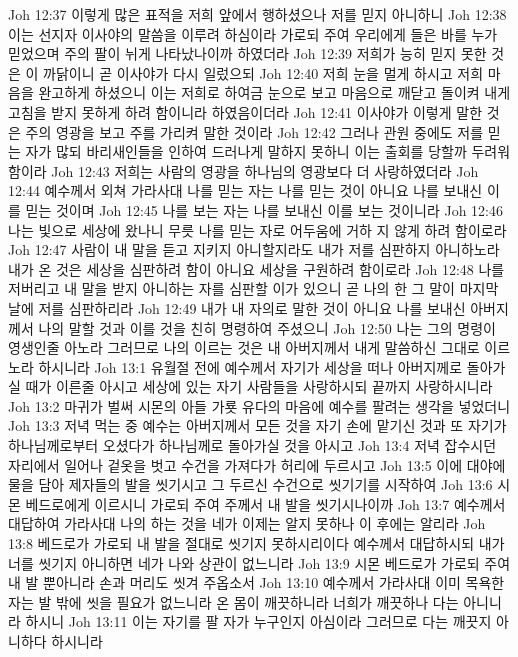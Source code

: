 Joh 12:37  이렇게 많은 표적을 저희 앞에서 행하셨으나 저를 믿지 아니하니
Joh 12:38  이는 선지자 이사야의 말씀을 이루려 하심이라 가로되 주여 우리에게 들은 바를 누가 믿었으며 주의 팔이 뉘게 나타났나이까 하였더라
Joh 12:39  저희가 능히 믿지 못한 것은 이 까닭이니 곧 이사야가 다시 일렀으되
Joh 12:40  저희 눈을 멀게 하시고 저희 마음을 완고하게 하셨으니 이는 저희로 하여금 눈으로 보고 마음으로 깨닫고 돌이켜 내게 고침을 받지 못하게 하려 함이니라 하였음이더라
Joh 12:41  이사야가 이렇게 말한 것은 주의 영광을 보고 주를 가리켜 말한 것이라
Joh 12:42  그러나 관원 중에도 저를 믿는 자가 많되 바리새인들을 인하여 드러나게 말하지 못하니 이는 출회를 당할까 두려워함이라
Joh 12:43  저희는 사람의 영광을 하나님의 영광보다 더 사랑하였더라
Joh 12:44  예수께서 외쳐 가라사대 나를 믿는 자는 나를 믿는 것이 아니요 나를 보내신 이를 믿는 것이며
Joh 12:45  나를 보는 자는 나를 보내신 이를 보는 것이니라
Joh 12:46  나는 빛으로 세상에 왔나니 무릇 나를 믿는 자로 어두움에 거하 지 않게 하려 함이로라
Joh 12:47  사람이 내 말을 듣고 지키지 아니할지라도 내가 저를 심판하지 아니하노라 내가 온 것은 세상을 심판하려 함이 아니요 세상을 구원하려 함이로라
Joh 12:48  나를 저버리고 내 말을 받지 아니하는 자를 심판할 이가 있으니 곧 나의 한 그 말이 마지막 날에 저를 심판하리라
Joh 12:49  내가 내 자의로 말한 것이 아니요 나를 보내신 아버지께서 나의 말할 것과 이를 것을 친히 명령하여 주셨으니
Joh 12:50  나는 그의 명령이 영생인줄 아노라 그러므로 나의 이르는 것은 내 아버지께서 내게 말씀하신 그대로 이르노라 하시니라
Joh 13:1  유월절 전에 예수께서 자기가 세상을 떠나 아버지께로 돌아가실 때가 이른줄 아시고 세상에 있는 자기 사람들을 사랑하시되 끝까지 사랑하시니라
Joh 13:2  마귀가 벌써 시몬의 아들 가룟 유다의 마음에 예수를 팔려는 생각을 넣었더니
Joh 13:3  저녁 먹는 중 예수는 아버지께서 모든 것을 자기 손에 맡기신 것과 또 자기가 하나님께로부터 오셨다가 하나님께로 돌아가실 것을 아시고
Joh 13:4  저녁 잡수시던 자리에서 일어나 겉옷을 벗고 수건을 가져다가 허리에 두르시고
Joh 13:5  이에 대야에 물을 담아 제자들의 발을 씻기시고 그 두르신 수건으로 씻기기를 시작하여
Joh 13:6  시몬 베드로에게 이르시니 가로되 주여 주께서 내 발을 씻기시나이까
Joh 13:7  예수께서 대답하여 가라사대 나의 하는 것을 네가 이제는 알지 못하나 이 후에는 알리라
Joh 13:8  베드로가 가로되 내 발을 절대로 씻기지 못하시리이다 예수께서 대답하시되 내가 너를 씻기지 아니하면 네가 나와 상관이 없느니라
Joh 13:9  시몬 베드로가 가로되 주여 내 발 뿐아니라 손과 머리도 씻겨 주옵소서
Joh 13:10  예수께서 가라사대 이미 목욕한 자는 발 밖에 씻을 필요가 없느니라 온 몸이 깨끗하니라 너희가 깨끗하나 다는 아니니라 하시니
Joh 13:11  이는 자기를 팔 자가 누구인지 아심이라 그러므로 다는 깨끗지 아니하다 하시니라
